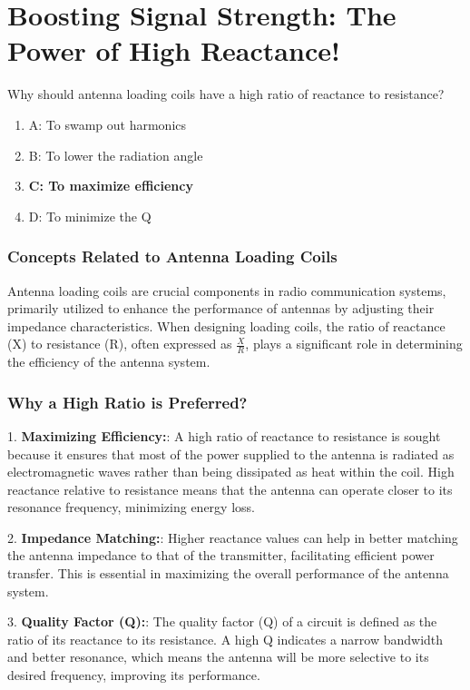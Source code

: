 \section*{Boosting Signal Strength: The Power of High Reactance!}
\begin{tcolorbox}[colback=gray!10, colframe=black, title=E9D04]
Why should antenna loading coils have a high ratio of reactance to resistance?
\begin{enumerate}[label=\Alph*)]
    \item A: To swamp out harmonics
    \item B: To lower the radiation angle
    \item \textbf{C: To maximize efficiency}
    \item D: To minimize the Q
\end{enumerate} \end{tcolorbox}

\subsubsection{Concepts Related to Antenna Loading Coils}
Antenna loading coils are crucial components in radio communication systems, primarily utilized to enhance the performance of antennas by adjusting their impedance characteristics. When designing loading coils, the ratio of reactance (X) to resistance (R), often expressed as \( \frac{X}{R} \), plays a significant role in determining the efficiency of the antenna system.

\subsubsection{Why a High Ratio is Preferred?}
1. \textbf{Maximizing Efficiency:}: A high ratio of reactance to resistance is sought because it ensures that most of the power supplied to the antenna is radiated as electromagnetic waves rather than being dissipated as heat within the coil. High reactance relative to resistance means that the antenna can operate closer to its resonance frequency, minimizing energy loss.

2. \textbf{Impedance Matching:}: Higher reactance values can help in better matching the antenna impedance to that of the transmitter, facilitating efficient power transfer. This is essential in maximizing the overall performance of the antenna system.

3. \textbf{Quality Factor (Q):}: The quality factor (Q) of a circuit is defined as the ratio of its reactance to its resistance. A high Q indicates a narrow bandwidth and better resonance, which means the antenna will be more selective to its desired frequency, improving its performance.

